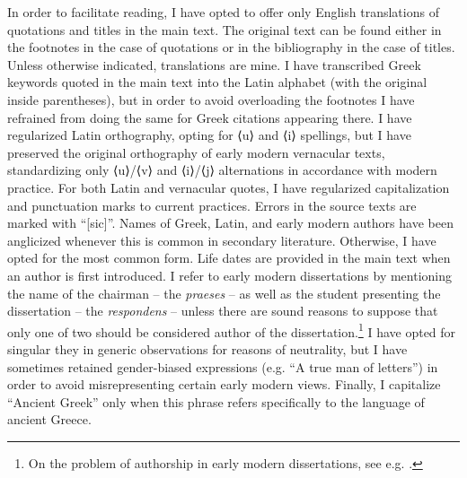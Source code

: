 \hypertarget{Toc19704800}{}
In order to facilitate reading, I have opted to offer only English translations of quotations and titles in the main text. The original text can be found either in the footnotes in the case of quotations or in the bibliography in the case of titles. Unless otherwise indicated, translations are mine. I have transcribed Greek keywords quoted in the main text into the Latin alphabet (with the original inside parentheses), but in order to avoid overloading the footnotes I have refrained from doing the same for Greek citations appearing there. I have regularized Latin orthography, opting for ⟨u⟩ and ⟨i⟩ spellings, but I have preserved the original orthography of early modern vernacular texts, standardizing only ⟨u⟩/⟨v⟩ and ⟨i⟩/⟨j⟩ alternations in accordance with modern practice. For both Latin and vernacular quotes, I have regularized capitalization and punctuation marks to current practices. Errors in the source texts are marked with “[sic]”. Names of Greek, Latin, and early modern authors have been anglicized whenever this is common in secondary literature. Otherwise, I have opted for the most common form. Life dates are provided in the main text when an author is first introduced. I refer to early modern dissertations by mentioning the name of the chairman – the \textit{praeses} – as well as the student presenting the dissertation – the \textit{respondens} – unless there are sound reasons to suppose that only one of two should be considered author of the dissertation.\footnote{On the problem of authorship in early modern dissertations, see e.g. \citet{Considine2008b}.} I have opted for singular they in generic observations for reasons of neutrality, but I have sometimes retained gender-biased expressions (e.g. “A true man of letters”) in order to avoid misrepresenting certain early modern views. Finally, I capitalize “Ancient Greek” only when this phrase refers specifically to the language of ancient Greece.
